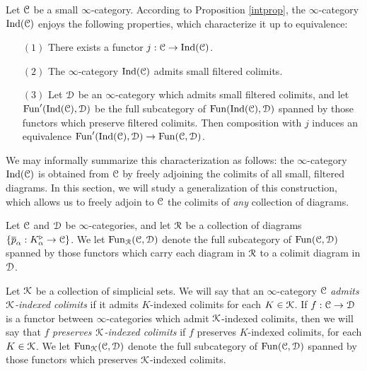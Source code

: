Let $\calC$ be a small $\infty$-category. According to Proposition \ref{intprop}, the 
$\infty$-category $\Ind(\calC)$ enjoys the following properties, which characterize it up to equivalence:
\begin{itemize}
\item[$(1)$] There exists a functor $j: \calC \rightarrow \Ind(\calC)$.
\item[$(2)$] The $\infty$-category $\Ind(\calC)$ admits small filtered colimits.
\item[$(3)$] Let $\calD$ be an $\infty$-category which admits small filtered colimits, and let
$\Fun'( \Ind(\calC), \calD)$ be the full subcategory of $\Fun( \Ind(\calC), \calD)$ spanned by those functors which preserve filtered colimits. Then composition with $j$ induces an equivalence
$\Fun'( \Ind(\calC), \calD) \rightarrow \Fun(\calC, \calD)$.
\end{itemize}
We may informally summarize this characterization as follows: the $\infty$-category $\Ind(\calC)$ is obtained from $\calC$ by freely adjoining the colimits of all small, filtered diagrams. In this section, we will study a generalization of this construction, which allows us to freely adjoin to $\calC$
the colimits of {\em any} collection of diagrams.

\begin{notation}\label{sipser}
Let $\calC$ and $\calD$ be $\infty$-categories, and let $\calR$ be a collection of diagrams
$\{ \overline{p}_{\alpha}: K_{\alpha}^{\triangleright} \rightarrow \calC \}$. We let
$\Fun_{\calR}(\calC, \calD)$ denote the full subcategory of
$\Fun(\calC, \calD)$ spanned by those functors which carry each diagram in $\calR$ to a colimit diagram in $\calD$.

Let $\calK$ be a collection of simplicial sets. We will say that an $\infty$-category
$\calC$ {\it admits $\calK$-indexed colimits} if it admits $K$-indexed colimits for each $K \in \calK$.
If $f: \calC \rightarrow \calD$ is a functor between $\infty$-categories which admit $\calK$-indexed colimits, then we will say that $f$ {\it preserves $\calK$-indexed colimits} if $f$ preserves $K$-indexed colimits, for each $K \in \calK$. We let $\Fun_{\calK}( \calC, \calD)$ denote the full subcategory of
$\Fun( \calC, \calD)$ spanned by those functors which preserves $\calK$-indexed colimits.
\end{notation}

